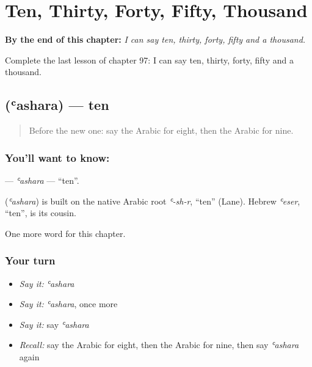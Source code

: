 
\chapter{Ten, Thirty, Forty, Fifty, Thousand}
\label{ch:ar-ten-thirty-forty-fifty-thousand}

\begin{chapteropening}
\textbf{By the end of this chapter:} \emph{I can say ten, thirty, forty, fifty and a thousand.}

Complete the last lesson of chapter 97: I can say ten, thirty, forty, fifty and a thousand.
\end{chapteropening}

\section[\texorpdfstring{\ar{عشرة} (ʿashara)}{عشرة (ʿashara)}]{ (ʿashara) — ten}

\label{lesson:AR-C97-ashara}



\begin{quote}
Before the new one: say the Arabic for eight, then the Arabic for nine.
\end{quote}

\subsection*{You'll want to know: }
\textbf{} — \emph{ʿashara} — \textquotedblleft{}ten\textquotedblright{}.

\begin{cousinweb}
\textbf{} (\emph{ʿashara}) is built on the native Arabic root \emph{ʿ-sh-r}, \textquotedblleft{}ten\textquotedblright{} (Lane). Hebrew \emph{ʿeser}, \textquotedblleft{}ten\textquotedblright{}, is its cousin.
\end{cousinweb}

\begin{grammarlens}[title={What you've built}]
One more word for this chapter.
\end{grammarlens}

\subsection*{Your turn}
\begin{itemize}
\raggedright
  \item \emph{Say it:} \emph{ʿashara}
  \item \emph{Say it:} \emph{ʿashara}, once more
  \item \emph{Say it:} say \emph{ʿashara}
  \item \emph{Recall:} say the Arabic for eight, then the Arabic for nine, then say \emph{ʿashara} again
\end{itemize}

